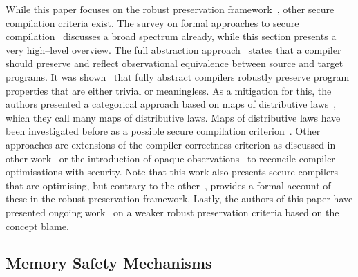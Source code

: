 \documentclass[utf8,acmsmall,review,screen,dvipsnames]{acmart}
\begin{document}
While this paper focuses on the robust preservation framework~\cite{abate2019jour}, other secure compilation criteria exist.
The survey on formal approaches to secure compilation~\cite{patrignani2019survey} discusses a broad spectrum already, while this section presents a very high--level overview.
The full abstraction approach~\cite{abadi1999fullabstraction} states that a compiler should preserve and reflect observational equivalence between source and target programs.
It was shown~\cite{abate2021faandrc} that fully abstract compilers robustly preserve program properties that are either trivial or meaningless.
As a mitigation for this, the authors presented a categorical approach based on maps of distributive laws~\cite{watanabe2002modl}, which they call many maps of distributive laws.
Maps of distributive laws have been investigated before as a possible secure compilation criterion~\cite{tsampas2020catsc}.
Other approaches are extensions of the compiler correctness criterion as discussed in other work~\cite{patterson2019next700} or the introduction of opaque observations~\cite{vu2021reconciling} to reconcile compiler optimisations with security.
Note that this work also presents secure compilers that are optimising, but contrary to the other~\cite{vu2021reconciling}, provides a formal account of these in the robust preservation framework.
Lastly, the authors of this paper have presented ongoing work~\cite{patrignani2023blame} on a weaker robust preservation criteria based on the concept blame.

\subsection{Memory Safety Mechanisms}\label{subsec:relw:msmechs}
\end{document}
